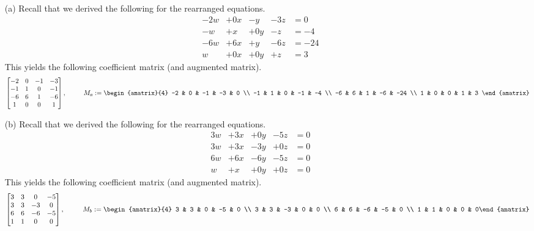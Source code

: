 \begin{SaveQuestion}
\begin{enumerate}
    \begin{enumerate}
        \item[(a)] Recall that we derived the following for the rearranged equations.
        $$\begin{array}{ccccl}
             -2w & + 0x & -y & -3z &= 0  \\
             -w & + x & + 0y & -z &= -4 \\
             -6w & +6x & + y & -6z &= -24 \\
             w & + 0x & + 0y & + z &= 3
        \end{array}$$
        This yields the following coefficient matrix (and augmented matrix).
        $$\begin{bmatrix} -2 & 0 & -1 & -3 \\ -1 & 1 & 0 & -1 \\ -6 & 6 & 1 & -6 \\ 1 & 0 & 0 & 1\end{bmatrix}, \ \ \ \ \ \ \ \ M_a := \begin{amatrix}{4} -2 & 0 & -1 & -3 & 0 \\ -1 & 1 & 0 & -1 & -4 \\ -6 & 6 & 1 & -6 & -24 \\ 1 & 0 & 0 & 1 & 3 \end{amatrix}$$
        \item[(b)] Recall that we derived the following for the rearranged equations.
        $$\begin{array}{ccccl}
             3w & + 3x & + 0y & -5z &= 0  \\
             3w & + 3x &  -3y & + 0z &= 0 \\
             6w & +6x & -6y & -5z &= 0 \\
             w & + x & + 0y & + 0z &= 0
        \end{array}$$
        This yields the following coefficient matrix (and augmented matrix).
        $$\begin{bmatrix} 3 & 3 & 0 & -5 \\ 3 & 3 & -3 & 0 \\ 6 & 6 & -6 & -5 \\ 1 & 1 & 0 & 0\end{bmatrix}, \ \ \ \ \ \ \ \ M_b := \begin{amatrix}{4} 3 & 3 & 0 & -5 & 0 \\ 3 & 3 & -3 & 0 & 0 \\ 6 & 6 & -6 & -5 & 0 \\ 1 & 1 & 0 & 0 & 0\end{amatrix}$$

\end{enumerate}
\end{enumerate}
\end{SaveQuestion}
